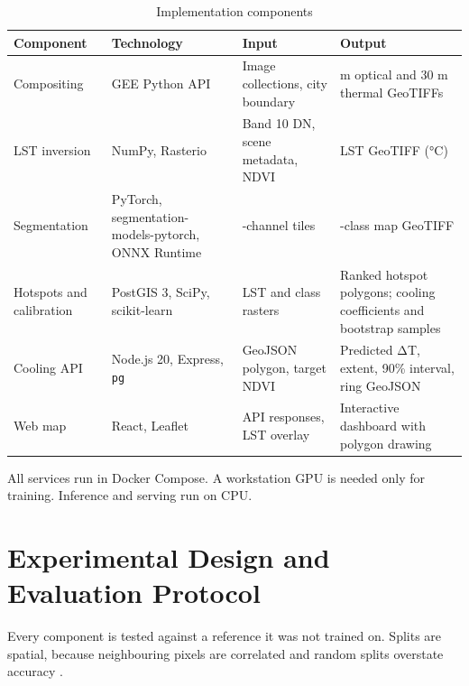 \documentclass[conference]{IEEEtran}
\begin{document}
\begin{table}[!t]
\centering\footnotesize
\caption{Implementation components}
\label{tab:3}
\renewcommand{\arraystretch}{1.15}
\begin{tabularx}{\textwidth}{>{\raggedright\arraybackslash}X>{\raggedright\arraybackslash}X>{\raggedright\arraybackslash}X>{\raggedright\arraybackslash}X}
\toprule
\textbf{Component} & \textbf{Technology} & \textbf{Input} & \textbf{Output} \\
\midrule
Compositing & GEE Python API & Image collections, city boundary & 10 m optical and 30 m thermal GeoTIFFs \\
LST inversion & NumPy, Rasterio & Band 10 DN, scene metadata, NDVI & LST GeoTIFF (°C) \\
Segmentation & PyTorch, segmentation-models-pytorch, ONNX Runtime & 7-channel tiles & 4-class map GeoTIFF \\
Hotspots and calibration & PostGIS 3, SciPy, scikit-learn & LST and class rasters & Ranked hotspot polygons; cooling coefficients and bootstrap samples \\
Cooling API & Node.js 20, Express, \texttt{pg} & GeoJSON polygon, target NDVI & Predicted ΔT, extent, 90\% interval, ring GeoJSON \\
Web map & React, Leaflet & API responses, LST overlay & Interactive dashboard with polygon drawing \\
\bottomrule
\end{tabularx}
\end{table}

All services run in Docker Compose. A workstation GPU is needed only for
training. Inference and serving run on CPU.

\section{Experimental Design and Evaluation
Protocol}\label{experimental-design-and-evaluation-protocol}

Every component is tested against a reference it was not trained on.
Splits are spatial, because neighbouring pixels are correlated and
random splits overstate accuracy \cite{b19}.
\end{document}
